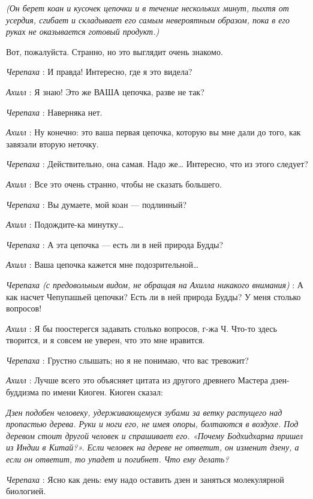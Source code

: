 \emph{(Он берет коан и кусочек цепочки и в течение нескольких минут, пыхтя от усердия, сгибает и складывает его самым невероятным образом, пока в его руках не оказывается готовый продукт.)}

Вот, пожалуйста. Странно, но это выглядит очень знакомо.

\emph{Черепаха} : И правда! Интересно, где я это видела?

\emph{Ахилл} : Я знаю! Это же ВАША цепочка, разве не так?

\emph{Черепаха} : Наверняка нет.

\emph{Ахилл} : Ну конечно: это ваша первая цепочка, которую вы мне дали до того, как завязали вторую неточку.

\emph{Черепаха} : Действительно, она самая. Надо же\ldots{} Интересно, что из этого следует?

\emph{Ахилл} : Все это очень странно, чтобы не сказать большего.

\emph{Черепаха} : Вы думаете, мой коан --- подлинный?

\emph{Ахилл} : Подождите-ка минутку\ldots{}

\emph{Черепаха} : А эта цепочка --- есть ли в ней природа Будды?

\emph{Ахилл} : Ваша цепочка кажется мне подозрительной\ldots{}

\emph{Черепаха (с предовольным видом, не обращая на Ахилла никакого внимания)} : А как насчет Чепупашьей цепочки? Есть ли в ней природа Будды? У меня столько вопросов!

\emph{Ахилл} : Я бы поостерегся задавать столько вопросов, г-жа Ч. Что-то здесь творится, и я совсем не уверен, что это мне нравится.

\emph{Черепаха} : Грустно слышать; но я не понимаю, что вас тревожит?

\emph{Ахилл} : Лучше всего это объясняет цитата из другого древнего Мастера дзен-буддизма по имени Киоген. Киоген сказал:

\emph{Дзен подобен человеку, удерживающемуся зубами за ветку растущего над пропастью дерева. Руки и ноги его, не имея опоры, болтаются в воздухе. Под деревом стоит другой человек и спрашивает его. «Почему Бодхидхарма пришел из Индии в Китай?». Если человек на дереве не ответит, он изменит дзену, а если он ответит, то упадет и погибнет. Что ему делать?}

\emph{Черепаха} : Ясно как день: ему надо оставить дзен и заняться молекулярной биологией.

